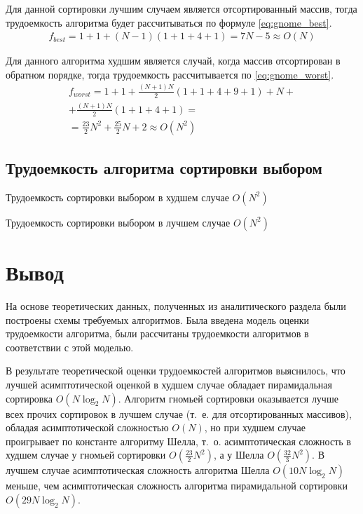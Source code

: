 Для данной сортировки лучшим случаем является отсортированный массив, тогда трудоемкость алгоритма будет рассчитываться по формуле \eqref{eq:gnome_best}.
\begin{equation}
	\label{eq:gnome_best}
	\begin{gathered}
		f_{best} = 1 + 1 + (N - 1)(1 + 1 + 4 + 1) = 7 N - 5 \approx O(N)
	\end{gathered}
\end{equation}

Для данного алгоритма худшим является случай, когда массив отсортирован в обратном порядке, тогда трудоемкость рассчитывается по \eqref{eq:gnome_worst}.
\begin{equation}
	\label{eq:gnome_worst}
	\begin{gathered}
		f_{worst} = 1 + 1 + \frac{(N + 1)N}{2}(1 + 1 + 4 + 9 + 1) + N + \\
		+ \frac{(N + 1)N}{2}(1 + 1 + 4 + 1) = 
		\\ = \frac{23}{2} N^2 + \frac{25}{2}N + 2 \approx O(N^2)
	\end{gathered}
\end{equation}

\subsection{Трудоемкость алгоритма сортировки выбором}

Трудоемкость сортировки выбором в худшем случае $O(N^2)$

Трудоемкость сортировки выбором в лучшем случае $O(N^2)$


\section*{Вывод}
На основе теоретических данных, полученных из аналитического раздела были построены схемы требуемых алгоритмов. 
Была введена модель оценки трудоемкости алгоритма, были рассчитаны трудоемкости алгоритмов в соответствии с этой моделью.

В результате теоретической оценки трудоемкостей алгоритмов выяснилось, что лучшей асимптотической оценкой в худшем случае обладает пирамидальная сортировка $O(N \log_{2}N)$. 
Алгоритм гномьей сортировки оказывается лучше всех прочих сортировок в лучшем случае (т.~е. для отсортированных массивов), обладая асимптотической сложностью $O(N)$, но при худшем случае проигрывает по константе алгоритму Шелла, т.~о. асимптотическая сложность в худшем случае у гномьей сортировки $O(\frac{23}{2}N^2)$, а у Шелла $O(\frac{32}{3} N ^ 2)$. 
В лучшем случае асимптотическая сложность алгоритма Шелла $O(10N\log_2N)$ меньше, чем асимптотическая сложность алгоритма пирамидальной сортировки $O(29N\log_2N)$.